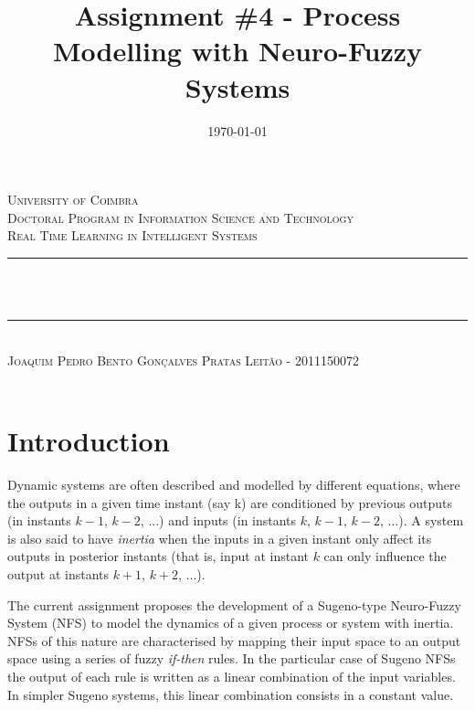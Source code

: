 \documentclass[11pt]{article}
\title{Assignment \#4 - Process Modelling with Neuro-Fuzzy Systems}
\date{\today}
\makeatletter
\let\thetitle\@title
\let\thedate\@date
\makeatother
\begin{document}

\begin{titlepage}
	\centering
    \textsc{\LARGE University of Coimbra}\\[1.0 cm]
	\textsc{\large Doctoral Program in Information Science and Technology}\\[0.5 cm]
    \textsc{\large Real Time Learning in Intelligent Systems}\\[5 cm]
	\rule{\linewidth}{0.2 mm} \\[0.4 cm]
	{ \LARGE \bfseries \thetitle}\\ [0.2 cm]
    \rule{\linewidth}{0.2 mm} \\[3 cm]
    
    \textsc{Joaquim Pedro Bento Gonçalves Pratas Leitão - 2011150072}\\[5 cm]
	
	{\large \thedate}\\[2 cm]
 
	\vfill
	
\end{titlepage}


\section{Introduction}
\label{introduction}

Dynamic systems are often described and modelled by different equations, where the outputs in a given time instant (say k) are conditioned by previous outputs (in instants $k-1$, $k-2$, ...) and inputs (in instants $k$, $k-1$, $k-2$, ...). A system is also said to have \emph{inertia} when the inputs in a given instant only affect its outputs in posterior instants (that is, input at instant $k$ can only influence the output at instants $k+1$, $k+2$, ...).

The current assignment proposes the development of a Sugeno-type Neuro-Fuzzy System (NFS) to model the dynamics of a given process or system with inertia. NFSs of this nature are characterised by mapping their input space to an output space using a series of fuzzy \emph{if-then} rules. In the particular case of Sugeno NFSs the output of each rule is written as a linear combination of the input variables. In simpler Sugeno systems, this linear combination consists in a constant value.
\end{document}
